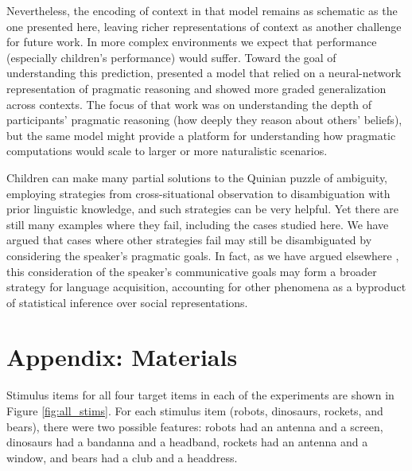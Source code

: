 \documentclass[man,noapacite]{apa2}
\begin{document}
Nevertheless, the encoding of context in that model remains as schematic as the one presented here, leaving richer representations of context as another challenge for future work. In more complex environments we expect that performance (especially children's performance) would suffer. Toward the goal of understanding this prediction,  presented a model that relied on a neural-network representation of pragmatic reasoning and showed more graded generalization across contexts. The focus of that work was on understanding the depth of participants' pragmatic reasoning (how deeply they reason about others' beliefs), but the same model might provide a platform for understanding how pragmatic computations would scale to larger or more naturalistic scenarios. 

Children can make many partial solutions to the Quinian \citeyear{quine1960} puzzle of ambiguity, employing strategies from cross-situational observation to disambiguation with prior linguistic knowledge, and such strategies can be very helpful. Yet there are still many examples where they fail, including the cases studied here. We have argued that cases where other strategies fail may still be disambiguated by considering the speaker's pragmatic goals. In fact, as we have argued elsewhere \cite{frank2009}, this consideration of the speaker's communicative goals may form a broader strategy for language acquisition, accounting for other phenomena as a byproduct of statistical inference over social representations. 

\newpage




\newpage

\theappendix 

\section{Appendix: Materials}

Stimulus items for all four target items in each of the experiments are shown in Figure \ref{fig:all_stims}. For each stimulus item (robots, dinosaurs, rockets, and bears), there were two possible features: robots had an antenna and a screen, dinosaurs had a bandanna and a headband, rockets had an antenna and a window, and bears had a club and a headdress.
\end{document}
